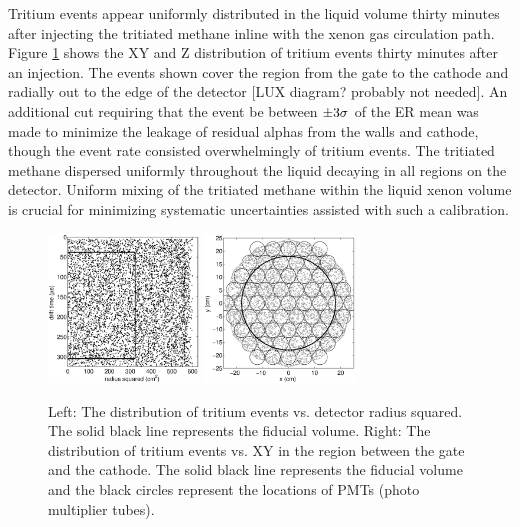 Tritium events appear uniformly distributed in the liquid volume thirty minutes after injecting the tritiated methane inline with the xenon gas circulation path. Figure \ref{fig:Density} shows the XY and Z distribution of tritium events thirty minutes after an injection. The events shown cover the region from the gate to the cathode and radially out to the edge of the detector [LUX diagram? probably not needed]. An additional cut requiring that the event be between $\rm \pm 3 \sigma$ of the ER mean was made to minimize the leakage of residual alphas from the walls and cathode, though the event rate consisted overwhelmingly of tritium events. The tritiated methane dispersed uniformly throughout the liquid decaying in all regions on the detector. Uniform mixing of the tritiated methane within the liquid xenon volume is crucial for minimizing systematic uncertainties assisted with such a calibration.
 
\begin{figure}[h!]\centering
\includegraphics[width=40mm]{CH3T_RZ_scatter_lux10_20130812T1546.eps}
\includegraphics[width=40mm]{CH3T_XY_scatter_PMT_lux10_20130812T1546.eps}
\caption{Left: The distribution of tritium events vs. detector radius squared. The solid black line represents the fiducial volume. Right: The distribution of tritium events vs. XY in the region between the gate and the cathode. The solid black line represents the fiducial volume and the black circles represent the locations of PMTs (photo multiplier tubes).}
\label{fig:Density}
\end{figure}

